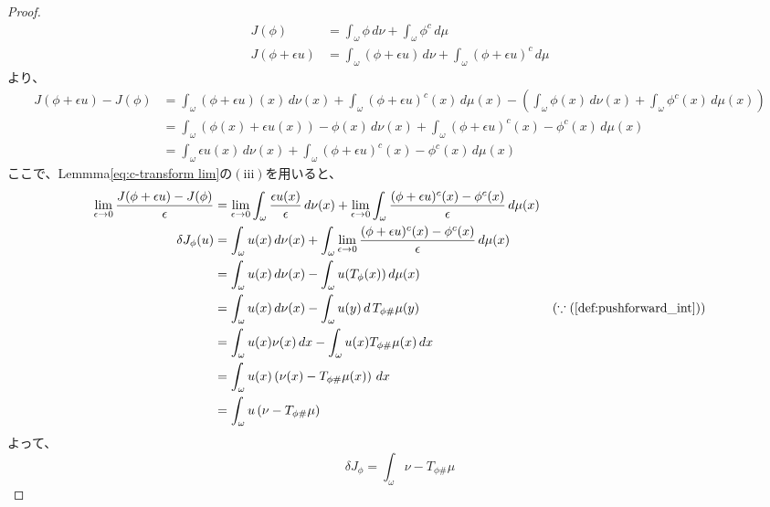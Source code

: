 \documentclass{jsarticle}
\theoremstyle{definition}
\begin{document}
\begin{proof}
  \begin{align*}
    J(\phi) &= \int_\omega \phi \, d\nu + \int_\omega \phi^c \, d\mu \\
    J(\phi + \epsilon u) &= \int_\omega (\phi + \epsilon u) \, d\nu + \int_\omega (\phi + \epsilon u)^c \, d\mu 
  \end{align*}
  より、
  \begin{align*}
    J(\phi + \epsilon u) - J(\phi)  &= \int_\omega (\phi + \epsilon u)(x) \, d\nu(x) + \int_\omega (\phi + \epsilon u)^c(x) \, d\mu(x) - \left( \int_\omega \phi(x) \, d\nu(x) + \int_\omega \phi^c(x) \, d\mu(x) \right)\\
                                    &= \int_\omega (\phi(x) + \epsilon u(x)) - \phi(x) \, d\nu(x) + \int_\omega (\phi + \epsilon u)^c(x) - \phi^c(x) \, d\mu(x) \\
                                    &= \int_\omega \epsilon u(x) \, d\nu(x) + \int_\omega (\phi + \epsilon u)^c(x) - \phi^c(x) \, d\mu(x) 
  \end{align*}
  ここで、Lemmma\ref{eq:c-transform lim}の$(\mathrm{iii})$を用いると、
  \begin{align*}
    \lim_{\epsilon \to 0} \frac{J(\phi + \epsilon u) - J(\phi)}{\epsilon} &= \lim_{\epsilon \to 0} \int_\omega \frac{ \epsilon u(x)}{\epsilon} \, d\nu(x) + \lim_{\epsilon \to 0} \int_\omega \frac{(\phi + \epsilon u)^c(x) - \phi^c(x)}{\epsilon} \, d\mu(x) \\
                                                        \delta J_\phi(u)  &= \int_\omega u(x) \, d\nu(x) + \int_\omega \lim_{\epsilon \to 0} \frac{(\phi + \epsilon u)^c(x) - \phi^c(x)}{\epsilon} \, d\mu(x) \\
                                                                          &= \int_\omega u(x) \, d\nu(x) - \int_\omega u(T_\phi(x)) \, d\mu(x) \\
                                                                          &= \int_\omega u(x) \, d\nu(x) - \int_\omega u(y) \, d\, T_{\phi \#} \mu(y) & (\because (\ref{def:pushforward_int}))\\
                                                                          &= \int_\omega u(x) \nu(x) \, dx - \int_\omega u(x) T_{\phi \#} \mu(x) \, dx\\
                                                                          &= \int_\omega u(x) \left(\nu(x) - T_{\phi \#} \mu(x) \right)\, dx\\
                                                                          &= \int_\omega u \left(\nu - T_{\phi \#} \mu \right)
  \end{align*}
  よって、
  \[
    \delta J_\phi = \int_\omega \nu - T_{\phi \#} \mu
  \]
\end{proof}
  
\end{document}

